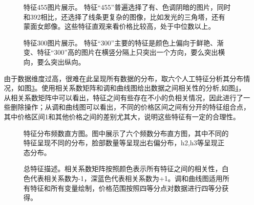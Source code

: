 \documentclass{article}
\begin{document}
\begin{figure}[!h]
	\centering
	\subfigure{\texttt{[image: 455-1]}}
	\subfigure{\texttt{[image: 455-2]}}
	\subfigure{\texttt{[image: 455-3]}}
	\subfigure{\texttt{[image: 455-4]}}
	\subfigure{\texttt{[image: 455-5]}}
	\subfigure{\texttt{[image: 455-6]}}
	\caption{特征455图片展示。 特征“455”普遍选择了有、色调阴暗的图片，同时和392相比，还选择了线条更复杂的图像，比如发光的三角塔，还有蒙面女郎像。这些特征直观来看价格比较高，处于中位数以上。}
	\label{图：455}
\end{figure}
\begin{figure}[!h]
	\centering
	\subfigure{\texttt{[image: 300-1]}}
	\subfigure{\texttt{[image: 300-2]}}
	\subfigure{\texttt{[image: 300-3]}}
	\caption{特征300图片展示。 特征“300”主要的特征是颜色上偏向于鲜艳、渐变、特征“300”高的图片在横竖分隔上只突出一个方向，要么突出横向，要么突出纵向。}
	\label{图：300}
\end{figure}
\par 由于数据维度过高，很难在此呈现所有数据的分布，取六个人工特征分析其分布情况，如图\ref{图：特征分布}。使用相关系数矩阵和调和曲线图给出数据之间相关性的分析,如图\ref{图：总特征矩阵}，从相关系数矩阵中可以看出，特征之间有些存在不小的负相关情况，因此进行了一些删除操作；从调和曲线图可以看出，不同的价格区间之间有分开的特征组合点，其中价格区间1和其他价格之间的差别尤其大，说明这些特征有一定的合理性。
\begin{figure}[!htbp]
	\centering
	\subfigure{\texttt{[image: h1]}}
	\subfigure{\texttt{[image: h2]}}
	\subfigure{\texttt{[image: h3]}}
	\caption{特征分布频数直方图。图中展示了六个频数分布直方图，其中不同的特征呈现不同的分布，脸部数量等呈现出右偏分布，h2,h3等呈现正态分布。}
	\label{图：特征分布}
\end{figure}
\begin{figure}[!htbp]
	\centering
	\caption{总特征描述。相关系数矩阵按照颜色表示所有特征之间的相关性，白色代表相关系数为-1，深蓝色代表相关系数为+1。调和曲线图适用所有特征和所有变量绘制，价格范围按照四等分点对数据进行四等分获得。}
	\label{图：总特征矩阵}
\end{figure}
\end{document}

